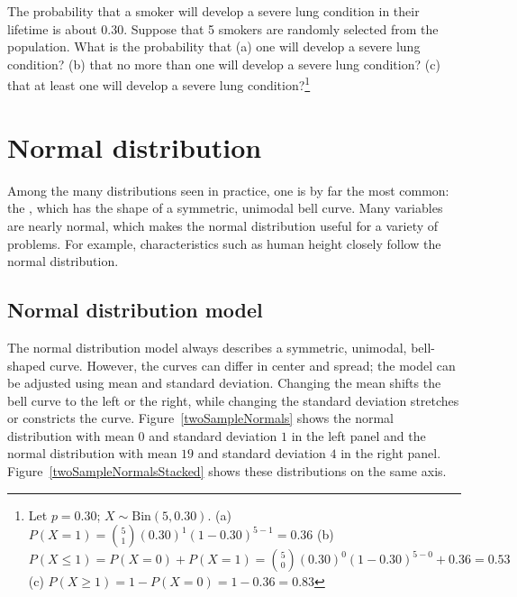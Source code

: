 \begin{exercise}
	The probability that a smoker will develop a severe lung condition in their lifetime is about 0.30. Suppose that 5 smokers are randomly selected from the population. What is the probability that (a) one will develop a severe lung condition? (b) that no more than one will develop a severe lung condition? (c) that at least one will develop a severe lung condition?\footnote{Let $p = 0.30$; $X \sim \textrm{Bin}(5, 0.30)$. (a) $P(X=1) = {5 \choose 1}(0.30)^1(1-0.30)^{5-1} = 0.36$ (b) $P(X \leq 1) = P(X=0) + P(X=1) = {5 \choose 0}(0.30)^0(1-0.30)^{5-0} + 0.36 = 0.53$ (c) $P(X \geq 1) = 1 - P(X=0) = 1 - 0.36 = 0.83$}	
\end{exercise}





\newpage

\section{Normal distribution}
\label{normalDist}

Among the many distributions seen in practice, one is by far the most common: the , which has the shape of a symmetric, unimodal bell curve. Many variables are nearly normal, which makes the normal distribution useful for a variety of problems. For example, characteristics such as human height closely follow the normal distribution.


\subsection{Normal distribution model}

The normal distribution model always describes a symmetric, unimodal, bell-shaped curve. However, the curves can differ in center and spread; the model can be adjusted using mean and standard deviation. Changing the mean shifts the bell curve to the left or the right, while changing the standard deviation stretches or constricts the curve. Figure~\ref{twoSampleNormals} shows the normal distribution with mean $0$ and standard deviation $1$ in the left panel and the normal distribution with mean $19$ and standard deviation $4$ in the right panel. Figure~\ref{twoSampleNormalsStacked} shows these distributions on the same axis.

